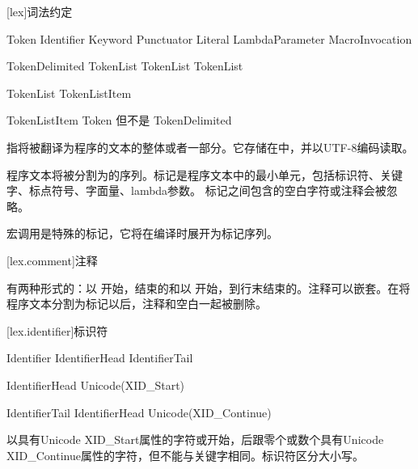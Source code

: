 
[lex]{词法约定}

\begin{bnf}{Token}
    Identifier \br
    Keyword \br
    Punctuator \br
    Literal \br
    LambdaParameter \br
    MacroInvocation
\end{bnf}

\begin{bnf}{TokenDelimited}
    \terminal{(} TokenList\bnfq \terminal{)} \br
    \terminal{[} TokenList\bnfq \terminal{]} \br
    \terminal{\{} TokenList\bnfq \terminal{\}}
\end{bnf}

\begin{bnf}{TokenList}
    TokenListItem\bnfp
\end{bnf}

\begin{bnf}{TokenListItem}
    Token \textnormal{但不是} \terminal{( ) [ ] \{ \}} \br
    TokenDelimited
\end{bnf}

\pnum
{}指将被翻译为\X{}程序的文本的整体或者一部分。它存储在中，并以UTF-8编码读取。

\pnum
程序文本将被分割为的序列。标记是程序文本中的最小单元，包括标识符、关键字、标点符号、字面量、lambda参数。
标记之间包含的空白字符或注释会被忽略。

\pnum
宏调用是特殊的标记，它将在编译时展开为标记序列。

[lex.comment]{注释}

\pnum
有两种形式的：以\tcode{/*} 开始，\tcode{*/}结束的和以\tcode{//} 开始，到行末结束的。注释可以嵌套。在将程序文本分割为标记以后，注释和空白一起被删除。

[lex.identifier]{标识符}

\begin{bnf}{Identifier}
    IdentifierHead IdentifierTail\bnfs
\end{bnf}

\begin{bnf}{IdentifierHead}
    Unicode(XID_Start) \br
    \terminal{_}
\end{bnf}

\begin{bnf}{IdentifierTail}
    IdentifierHead \br
    Unicode(XID_Continue)
\end{bnf}

\pnum
{}以具有Unicode XID_Start属性的字符或\tcode{_}开始，后跟零个或数个具有Unicode XID_Continue属性的字符，但不能与关键字相同。标识符区分大小写。

